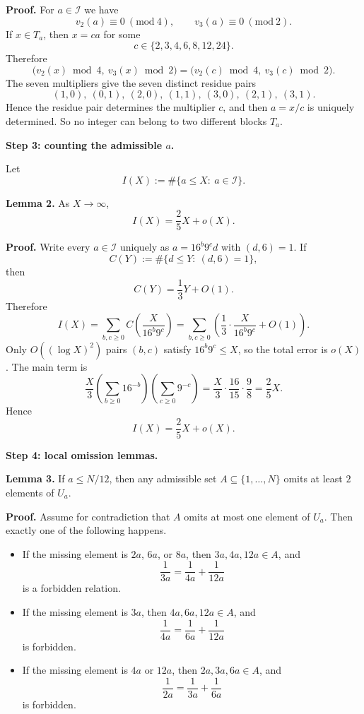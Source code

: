 \medskip
\noindent\textbf{Proof.}
For $a\in\mathcal I$ we have
\[
v_2(a)\equiv 0\ (\mathrm{mod}\ 4),\qquad v_3(a)\equiv 0\ (\mathrm{mod}\ 2).
\]
If $x\in T_a$, then $x=ca$ for some
\[
c\in\{2,3,4,6,8,12,24\}.
\]
Therefore
\[
\bigl(v_2(x)\bmod 4,\ v_3(x)\bmod 2\bigr)
=
\bigl(v_2(c)\bmod 4,\ v_3(c)\bmod 2\bigr).
\]
The seven multipliers give the seven distinct residue pairs
\[
(1,0),\ (0,1),\ (2,0),\ (1,1),\ (3,0),\ (2,1),\ (3,1).
\]
Hence the residue pair determines the multiplier $c$, and then $a=x/c$ is uniquely determined. So no integer can belong to two different blocks $T_a$.

\medskip
\noindent\textbf{Step 3: counting the admissible $a$.}

Let
\[
I(X):=\#\{a\le X:\ a\in\mathcal I\}.
\]

\medskip
\noindent\textbf{Lemma 2.}
As $X\to\infty$,
\[
I(X)=\frac25 X+o(X).
\]

\medskip
\noindent\textbf{Proof.}
Write every $a\in\mathcal I$ uniquely as $a=16^b9^cd$ with $(d,6)=1$. If
\[
C(Y):=\#\{d\le Y:\ (d,6)=1\},
\]
then
\[
C(Y)=\frac13 Y+O(1).
\]
Therefore
\[
I(X)=\sum_{b,c\ge 0} C\!\left(\frac{X}{16^b9^c}\right)
=\sum_{b,c\ge 0}\left(\frac13\cdot \frac{X}{16^b9^c}+O(1)\right).
\]
Only $O((\log X)^2)$ pairs $(b,c)$ satisfy $16^b9^c\le X$, so the total error is $o(X)$. The main term is
\[
\frac{X}{3}\left(\sum_{b\ge 0}16^{-b}\right)\left(\sum_{c\ge 0}9^{-c}\right)
=
\frac{X}{3}\cdot \frac{16}{15}\cdot \frac98
=
\frac25 X.
\]
Hence
\[
I(X)=\frac25 X+o(X).
\]

\medskip
\noindent\textbf{Step 4: local omission lemmas.}

\medskip
\noindent\textbf{Lemma 3.}
If $a\le N/12$, then any admissible set $A\subseteq \{1,\ldots,N\}$ omits at least $2$ elements of $U_a$.

\medskip
\noindent\textbf{Proof.}
Assume for contradiction that $A$ omits at most one element of $U_a$. Then exactly one of the following happens.

\begin{itemize}
\item If the missing element is $2a$, $6a$, or $8a$, then $3a,4a,12a\in A$, and
\[
\frac1{3a}=\frac1{4a}+\frac1{12a}
\]
is a forbidden relation.
\item If the missing element is $3a$, then $4a,6a,12a\in A$, and
\[
\frac1{4a}=\frac1{6a}+\frac1{12a}
\]
is forbidden.
\item If the missing element is $4a$ or $12a$, then $2a,3a,6a\in A$, and
\[
\frac1{2a}=\frac1{3a}+\frac1{6a}
\]
is forbidden.
\end{itemize}

